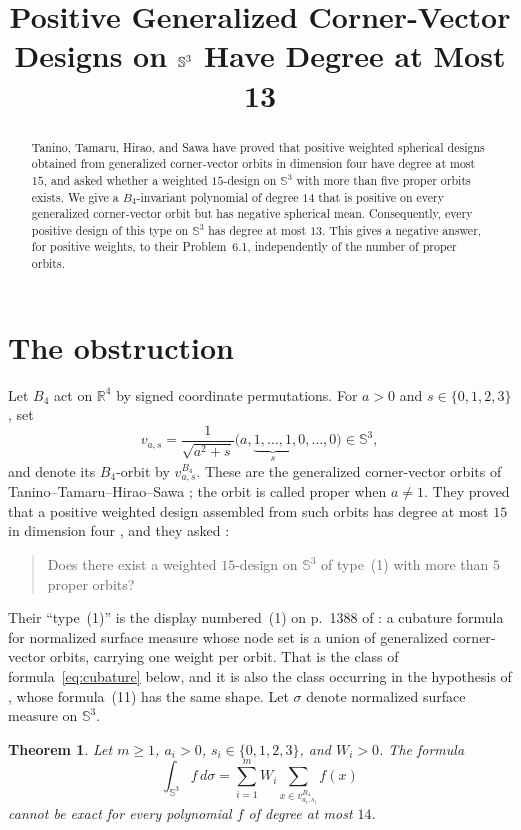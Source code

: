 \documentclass[11pt]{amsart}
\title[Generalized Corner-Vector Designs on $\Sph^3$]
{Positive Generalized Corner-Vector Designs on
\texorpdfstring{$\Sph^3$}{S3} Have Degree at Most 13}
\date{}
\newtheorem{theorem}{Theorem}
\theoremstyle{remark}
\newcommand{\Sph}{\mathbb{S}}
\begin{document}
\begin{abstract}
Tanino, Tamaru, Hirao, and Sawa have proved that positive weighted
spherical designs obtained from generalized corner-vector orbits in
dimension four have degree at most $15$, and asked whether a weighted
$15$-design on $\Sph^3$ with more than five proper orbits exists. We
give a $B_4$-invariant polynomial of degree $14$ that is positive on
every generalized corner-vector orbit but has negative spherical mean.
Consequently, every positive design of this type on $\Sph^3$ has degree
at most $13$. This gives a negative answer, for positive weights, to
their Problem~6.1, independently of the number of proper orbits.
\end{abstract}

\maketitle

\section{The obstruction}

Let $B_4$ act on $\mathbb{R}^4$ by signed coordinate permutations. For
$a>0$ and $s\in\{0,1,2,3\}$, set
\[
v_{a,s}
=
\frac{1}{\sqrt{a^2+s}}
\bigl(a,\underbrace{1,\ldots,1}_{s},0,\ldots,0\bigr)
\in\Sph^3,
\]
and denote its $B_4$-orbit by $v_{a,s}^{B_4}$. These are the
generalized corner-vector orbits of Tanino--Tamaru--Hirao--Sawa
\cite[Definition~2.19]{TTHS}; the orbit is called proper when $a\ne1$.
They proved that a positive weighted design assembled from such orbits
has degree at most $15$ in dimension four \cite[Theorem~3.1]{TTHS}, and
they asked \cite[Problem~6.1]{TTHS}:
\begin{quote}
Does there exist a weighted $15$-design on $\Sph^3$ of type~(1) with
more than $5$ proper orbits?
\end{quote}
Their ``type~(1)'' is the display numbered~(1) on p.~1388 of
\cite{TTHS}: a cubature formula for normalized surface measure whose
node set is a union of generalized corner-vector orbits, carrying one
weight per orbit. That is the class of formula~\eqref{eq:cubature}
below, and it is also the class occurring in the hypothesis of
\cite[Theorem~3.1]{TTHS}, whose formula~(11) has the same shape. Let
$\sigma$ denote normalized surface measure on $\Sph^3$.

\begin{theorem}\label{thm:main}
Let $m\ge1$, $a_i>0$, $s_i\in\{0,1,2,3\}$, and $W_i>0$. The formula
\begin{equation}\label{eq:cubature}
\int_{\Sph^3} f\,d\sigma
=
\sum_{i=1}^{m}W_i\sum_{x\in v_{a_i,s_i}^{B_4}}f(x)
\end{equation}
cannot be exact for every polynomial $f$ of degree at most $14$.
\end{theorem}
\end{document}
